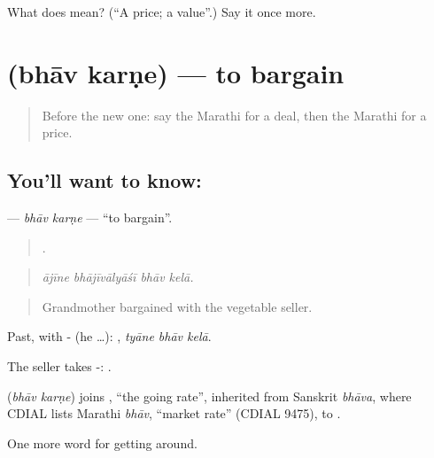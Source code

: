 \begin{tcolorbox}[breakable,colback=teal!4,colframe=teal!35!black,title={Before you move on}]
What does  mean? (\textquotedblleft{}A price; a value\textquotedblright{}.) Say it once more.
\end{tcolorbox}
\section[\texorpdfstring{\mr{भाव} \mr{करणे} (bhāv karṇe)}{भाव करणे (bhāv karṇe)}]{  (bhāv karṇe) — to bargain}

\label{lesson:MR-C423-bhav-karne}



\begin{quote}
Before the new one: say the Marathi for a deal, then the Marathi for a price.
\end{quote}

\subsection*{You'll want to know:  }
\textbf{ } — \emph{bhāv karṇe} — \textquotedblleft{}to bargain\textquotedblright{}.

\begin{quote}
   .
\end{quote}

\begin{quote}
\emph{ājīne bhājīvālyāśī bhāv kelā.}
\end{quote}

\begin{quote}
Grandmother bargained with the vegetable seller.
\end{quote}

Past, with - (he …):   , \emph{tyāne bhāv kelā}.

The seller takes -:   .

\begin{cousinweb}
\textbf{ } (\emph{bhāv karṇe}) joins \textbf{}, \textquotedblleft{}the going rate\textquotedblright{}, inherited from Sanskrit \emph{bhāva}, where CDIAL lists Marathi \emph{bhāv}, \textquotedblleft{}market rate\textquotedblright{} (CDIAL 9475), to \textbf{}.
\end{cousinweb}

\begin{grammarlens}[title={What you've built}]
One more word for getting around.
\end{grammarlens}

